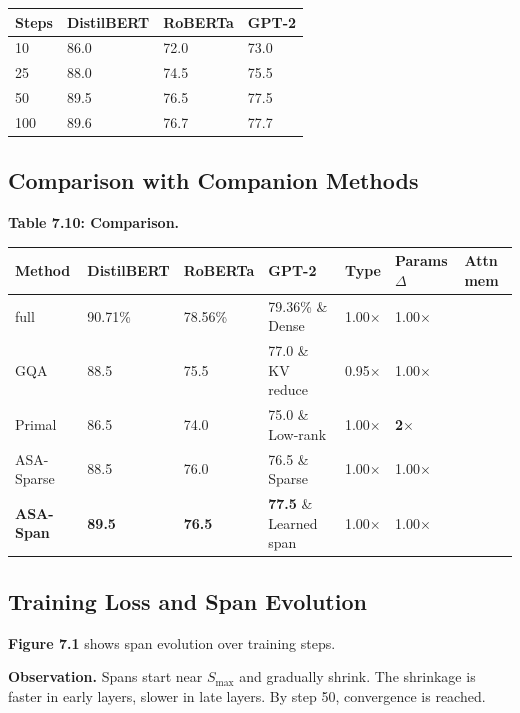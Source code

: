 \begin{table}[H]
\centering
\small
\begin{tabular}{llll}
\toprule
\textbf{Steps} & \textbf{DistilBERT} & \textbf{RoBERTa} & \textbf{GPT-2} \\
\midrule
10 & 86.0 & 72.0 & 73.0 \\
25 & 88.0 & 74.5 & 75.5 \\
50 & 89.5 & 76.5 & 77.5 \\
100 & 89.6 & 76.7 & 77.7 \\
\bottomrule
\end{tabular}
\end{table}

\subsection{Comparison with Companion Methods}

\textbf{Table 7.10: Comparison.}

\begin{table}[H]
\centering
\small
\begin{tabular}{lllllll}
\toprule
\textbf{Method} & \textbf{DistilBERT} & \textbf{RoBERTa} & \textbf{GPT-2} & \textbf{Type} & \textbf{Params $\Delta$} & \textbf{Attn mem} \\
\midrule
full & 90.71\% & 78.56\% & 79.36\% \& Dense & 1.00$\times$ & 1.00$\times$ \\
GQA & 88.5 & 75.5 & 77.0 \& KV reduce & 0.95$\times$ & 1.00$\times$ \\
Primal & 86.5 & 74.0 & 75.0 \& Low-rank & 1.00$\times$ & \textbf{2$\times$} \\
ASA-Sparse & 88.5 & 76.0 & 76.5 \& Sparse & 1.00$\times$ & 1.00$\times$ \\
\textbf{ASA-Span} & \textbf{89.5} & \textbf{76.5} & \textbf{77.5} \& Learned span & 1.00$\times$ & 1.00$\times$ \\
\bottomrule
\end{tabular}
\end{table}

\subsection{Training Loss and Span Evolution}

\textbf{Figure 7.1} shows span evolution over training steps.

\textbf{Observation.} Spans start near $S_\text{max}$ and gradually shrink. The 
shrinkage is faster in early layers, slower in late layers. By step 50, 
convergence is reached.

